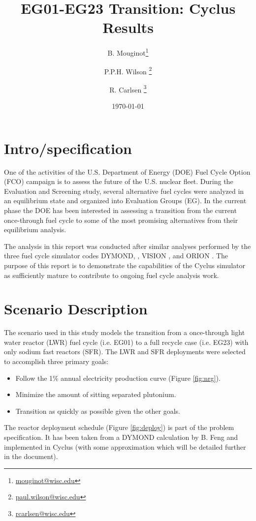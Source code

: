 \documentclass[12pt]{article}
\title{EG01-EG23 Transition: Cyclus Results}
\author[1]{B. Mouginot\thanks{\href{mailto:mouginot@wisc.edu}{mouginot@wisc.edu}}}
\author[1]{P.P.H. Wilson \thanks{\href{mailto:paul.wilson@wisc.edu}{paul.wilson@wisc.edu}}}
\author[1]{R. Carlsen \thanks{\href{mailto:rcarlsen@wisc.edu}{rcarlsen@wisc.edu}}}
\affil[1]{University of Wisconsin--Madison, Department of Engineering Physics, CNERG group}
\date{\today}
\begin{document}
\maketitle

\section{Intro/specification}

One of the activities of the U.S. Department of Energy (DOE) Fuel Cycle Option (FCO) campaign is
to assess the future of the U.S. nuclear fleet. During the Evaluation and Screening study, 
several alternative fuel cycles were analyzed in an equilibrium state and organized into Evaluation
Groups (EG).  In the current phase the DOE has been interested in assessing a transition from the
current once-through fuel cycle to some of the most promising alternatives from their
equilibrium analysis.

The analysis in this report was conducted after similar analyses performed by the
three fuel cycle simulator codes DYMOND, \cite{dymon}, VISION \cite{vision},
and ORION \cite{orion}. The purpose of this report is to demonstrate the
capabilities of the Cyclus simulator \cite{cyclus} as sufficiently mature to
contribute to ongoing fuel cycle analysis work.

\section{Scenario Description}

The scenario used in this study models the transition from a once-through light
water reactor (LWR) fuel cycle (i.e. EG01) to a full recycle case (i.e. EG23)
with only sodium fast reactors (SFR).  The LWR and SFR deployments were selected
to accomplish three primary goals:

\begin{itemize}
    \item Follow the 1\% annual electricity production curve (Figure \ref{fig:nrg}).
    \item Minimize the amount of sitting separated plutonium.
    \item Transition as quickly as possible given the other goals.
\end{itemize}

The reactor deployment schedule (Figure \ref{fig:deploy}) is part of the problem
specification. It has been taken from a DYMOND calculation by B.
Feng\cite{B.Feng_calculation} and implemented in Cyclus (with some approximation
which will be detailed further in the document).
\end{document}
